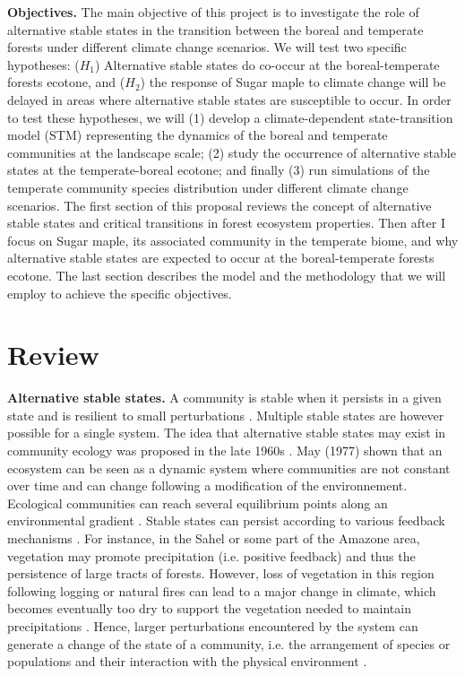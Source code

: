 \textbf{Objectives.} The main objective of this project is to investigate the
role of alternative stable states in the transition between the boreal and
temperate forests under different climate change scenarios. We will test two
specific hypotheses: ($H_1$) Alternative stable states do co-occur at the
boreal-temperate forests ecotone, and ($H_2$) the response of Sugar maple to
climate change will be delayed in areas where alternative stable states are
susceptible to occur. In order to test these hypotheses, we will (1) develop a
climate-dependent state-transition model (STM) representing the dynamics of
the boreal and temperate communities at the landscape scale; (2) study the
occurrence of alternative stable states at the temperate-boreal ecotone; and
finally (3) run simulations of the temperate community species distribution
under different climate change scenarios. The first section of this proposal
reviews the concept of alternative stable states and critical transitions in
forest ecosystem properties. Then after I focus on Sugar maple, its associated
community in the temperate biome, and why alternative stable states are
expected to occur at the boreal-temperate forests ecotone. The last section
describes the model and the methodology that we will employ to achieve the
specific objectives.

\section{Review}

\textbf{Alternative stable states.} A community is stable when it persists in a
given state and is resilient to small perturbations \cite{Filbee-Dexter2013}.
Multiple stable states are however possible for a single system. The idea that alternative
stable states may exist in community ecology was proposed in the late 1960s
\cite{Scheffer2001,Society2014a}.  May (1977) \cite{May1977} shown that an
ecosystem can be seen as a dynamic system where communities are not constant
over time and can change following a modification of the environnement.
Ecological communities can reach several equilibrium points
along an environmental gradient \cite{May1977}. Stable states can persist
according to various feedback mechanisms \cite{Filbee-Dexter2013}. For
instance, in the Sahel or some part of the Amazone area, vegetation may
promote precipitation (i.e. positive feedback) and thus the persistence of
large tracts of forests. However, loss of vegetation  in this region following
logging or natural fires can lead to a major change in climate, which becomes
eventually too dry to support the vegetation needed to maintain precipitations
\cite{scheffer2009critical}. Hence, larger perturbations encountered by the
system can generate a change of the state of a community, i.e. the arrangement
of species or populations and their interaction with the physical environment
\cite{Filbee-Dexter2013}.\\


